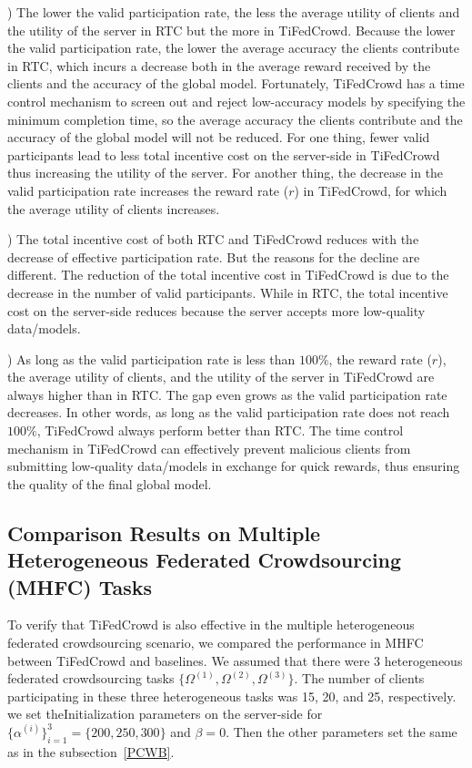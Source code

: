 \documentclass[final,1p,times]{elsarticle}
\begin{document}
\lowercase{}) The lower the valid participation rate, the less the average utility of clients and the utility of the server in RTC but the more in TiFedCrowd. Because the lower the valid participation rate, the lower the average accuracy the clients contribute in RTC, which incurs a decrease both in the average reward received by the clients and the accuracy of the global model. Fortunately, TiFedCrowd has a time control mechanism to screen out and reject low-accuracy models by specifying the minimum completion time, so the average accuracy the clients contribute and the accuracy of the global model will not be reduced. For one thing, fewer valid participants lead to less total incentive cost on the server-side in TiFedCrowd thus increasing the utility of the server. For another thing, the decrease in the valid participation rate increases the reward rate ($r$) in TiFedCrowd, for which the average utility of clients increases. 

\lowercase{}) The total incentive cost of both RTC and TiFedCrowd reduces with the decrease of effective participation rate. But the reasons for the decline are different. The reduction of the total incentive cost in TiFedCrowd is due to the decrease in the number of valid participants. While in RTC, the total incentive cost on the server-side reduces because the server accepts more low-quality data/models. 

\lowercase{}) As long as the valid participation rate is less than $100\%$, the reward rate ($r$), the average utility of clients, and the utility of the server in TiFedCrowd are always higher than in RTC. The gap even grows as the valid participation rate decreases. In other words, as long as the valid participation rate does not reach $100\%$, TiFedCrowd always perform better than RTC. The time control mechanism in TiFedCrowd can effectively prevent malicious clients from submitting low-quality data/models in exchange for quick rewards, thus ensuring the quality of the final global model.

\subsection{Comparison Results on Multiple Heterogeneous Federated Crowdsourcing (MHFC) Tasks} \label{MHFC}

To verify that TiFedCrowd is also effective in the multiple heterogeneous federated crowdsourcing scenario, we compared the performance in MHFC between TiFedCrowd and baselines. We assumed that there were 3 heterogeneous federated crowdsourcing tasks $\{\Omega^{(1)},\Omega^{(2)},\Omega^{(3)}\}$. The number of clients participating in these three heterogeneous tasks was 15, 20, and 25, respectively. we set theInitialization parameters on the server-side for $\{\alpha^{(i)}\}_{i=1}^3 = \{200, 250, 300\}$ and $\beta=0$. Then the other parameters set the same as in the subsection~\ref{PCWB}.
\end{document}
